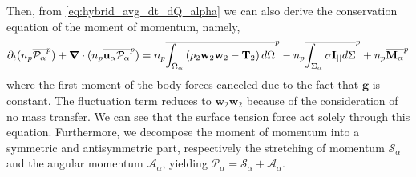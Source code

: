 Then, from \ref{eq:hybrid_avg_dt_dQ_alpha} we can also derive the conservation equation of the moment of momentum, namely, 
\begin{multline}
    \partial_t (n_p\overline{\mathcal{P}_\alpha}^{p})
    + \bm{\nabla}\cdot (n_p\overline{  \textbf{u}_\alpha \mathcal{P}_\alpha}^{p})
    = n_p\overline{\int_{\Omega_\alpha} \left(
        \rho_2 \textbf{w}_2 \textbf{w}_2
        - \mathbf{T}_2
        \right) d\Omega}^{p}
        - n_p\overline{\int_{\Sigma_\alpha} \sigma \textbf{I}_{||} d\Sigma}^{p}
        + n_p\overline{\textbf{M}_\alpha}^{p}
    \label{eq:hybrid_avg_dt_dP_alpha}
\end{multline}
where the first moment of the body forces canceled due to the fact that $\textbf{g}$ is constant. 
The fluctuation term reduces to $\textbf{w}_2\textbf{w}_2$ because of the consideration of no mass transfer. 
We can see that the surface tension force act solely through this equation. 
Furthermore, we decompose the moment of momentum into a symmetric and antisymmetric part, respectively the stretching of momentum $\mathcal{S}_\alpha$ and the angular momentum $\mathcal{A}_\alpha$, yielding $\mathcal{P}_\alpha = \mathcal{S}_\alpha+\mathcal{A}_\alpha$.


